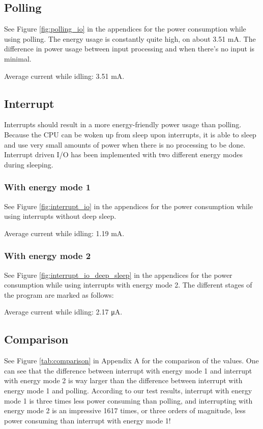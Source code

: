 \subsection{Polling}

See Figure \ref{fig:polling_io} in the appendices for the power consumption while using polling. The energy usage is constantly quite high, on about 3.51 mA. The difference in power usage between input processing and when there's no input is minimal.

Average current while idling: 3.51 mA.

\subsection{Interrupt}

Interrupts should result in a more energy-friendly power usage than polling.
Because the CPU can be woken up from sleep upon interrupts, it is able to sleep and use very small amounts of power when there is no processing to be done. Interrupt driven I/O has been implemented with two different energy modes during sleeping.

\subsubsection{With energy mode 1}

See Figure \ref{fig:interrupt_io} in the appendices for the power consumption while using interrupts without deep sleep.

Average current while idling: 1.19 mA.

\subsubsection{With energy mode 2}

See Figure \ref{fig:interrupt_io_deep_sleep} in the appendices for the power consumption while using interrupts with energy mode 2. The different stages of the program are marked as follows:

Average current while idling: 2.17 \si{\micro\ampere}.

\subsection{Comparison}

See Figure \ref{tab:comparison} in Appendix A for the comparison of the values. One can see that the difference between interrupt with energy mode 1 and interrupt with energy mode 2 is way larger than the difference between interrupt with energy mode 1 and polling. According to our test results, interrupt with energy mode 1 is three times less power consuming than polling, and interrupting with energy mode 2 is an impressive 1617 times, or three orders of magnitude, less power consuming than interrupt with energy mode 1!
